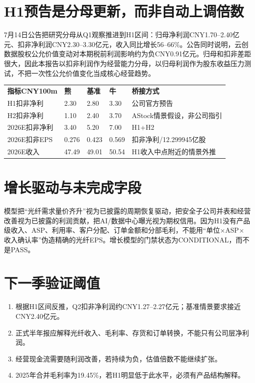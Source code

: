 \section{H1预告是分母更新，而非自动上调倍数}
7月14日公告把研究分母从Q1观察推进到H1区间：归母净利润CNY1.70--2.40亿元、扣非净利润CNY2.30--3.30亿元，收入同比增长56--66\%。公告同时说明，云创数据股权公允价值变动对本期税前利润影响约为负CNY0.91亿元。归母和扣非差距很大，因此本报告以扣非利润作为经营能力分母，以归母利润作为股东收益压力测试，不把一次性公允价值变化当成核心经营趋势。

\begin{exhibitbox}
\begin{tabularx}{\exhibitboxwidth}{L{2.8cm}R{1.8cm}R{1.8cm}R{1.8cm}X}
\textbf{指标CNY100m} & \textbf{熊} & \textbf{基准} & \textbf{牛} & \textbf{桥接方式} \\
H1扣非净利 & 2.30 & 2.80 & 3.30 & 公司官方预告 \\
H2扣非净利 & 1.10 & 2.40 & 3.70 & AStock情景假设，非公司指引 \\
2026E扣非净利 & 3.40 & 5.20 & 7.00 & H1+H2 \\
2026E扣非EPS & 0.276 & 0.423 & 0.569 & 扣非净利/12.299945亿股 \\
2026E收入 & 47.49 & 49.01 & 50.54 & H1收入中点附近的情景外推 \\
\end{tabularx}
\end{exhibitbox}

\section{增长驱动与未完成字段}
模型把“光纤需求量价齐升”视为已披露的周期恢复驱动，把安全子公司并表和经营改善视为已披露的利润贡献，把AI/数据中心曝光视为期权信用。因为H1没有产品级收入、ASP、利用率、客户分配、订单金额和分部毛利，不能用“单位×ASP×收入确认率”伪造精确的光纤EPS。增长模型的门禁状态为CONDITIONAL，而不是PASS。

\section{下一季验证阈值}
\begin{enumerate}
\item 根据H1区间反推，Q2扣非净利润约CNY1.27--2.27亿元；基准情景要求接近CNY2.40亿元。
\item 正式半年报应解释光纤收入、毛利率、存货和订单转换，不能只有公司层净利润。
\item 经营现金流需要随利润改善，若持续为负，估值倍数不能继续扩张。
\item 2025年合并毛利率为19.45\%，若H1明显低于此水平，必须有产品结构解释。
\end{enumerate}

